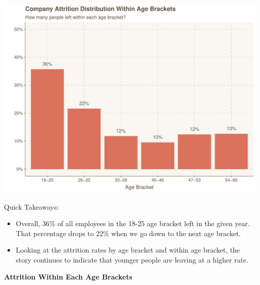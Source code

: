 \documentclass[
]{article}
\newenvironment{Shaded}{\begin{snugshade}}{\end{snugshade}}
\newcommand{\DataTypeTok}[1]{\textcolor[rgb]{0.13,0.29,0.53}{#1}}
\newcommand{\KeywordTok}[1]{\textcolor[rgb]{0.13,0.29,0.53}{\textbf{#1}}}
\newcommand{\NormalTok}[1]{#1}
\newcommand{\OperatorTok}[1]{\textcolor[rgb]{0.81,0.36,0.00}{\textbf{#1}}}
\newcommand{\StringTok}[1]{\textcolor[rgb]{0.31,0.60,0.02}{#1}}
\providecommand{\tightlist}{%
  \setlength{\itemsep}{0pt}\setlength{\parskip}{0pt}}
\begin{document}
\includegraphics{figures/Attrition Within Age Brackets-1.pdf}

Quick Takeaways:

\begin{itemize}
\tightlist
\item
  Overall, 36\% of all employees in the 18-25 age bracket left in the
  given year. That percentage drops to 22\% when we go down to the next
  age bracket.
\item
  Looking at the attrition rates by age bracket and within age bracket,
  the story continues to indicate that younger people are leaving at a
  higher rate.
\end{itemize}

\textbf{Attrition Within Each Age Brackets}

\begin{Shaded}
\end{Shaded}
\end{document}
